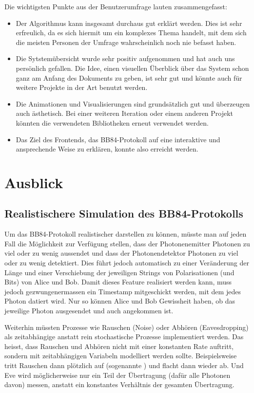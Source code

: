 \documentclass[a4paper,10.2pt,pdftex]{scrartcl}%
\newcommand{\q}[1]{\iflanguage{ngerman}{\flqq#1\frqq}{``#1''}}
\begin{document}
Die wichtigsten Punkte aus der Benutzerumfrage lauten zusammengefasst:

\begin{itemize}
\item Der Algorithmus kann insgesamt durchaus gut erklärt werden. Dies ist sehr erfreulich, da es sich hiermit um ein komplexes Thema handelt, mit dem sich die meisten Personen der Umfrage wahrscheinlich noch nie befasst haben.
\item Die Sytstemübersicht wurde sehr positiv aufgenommen und hat auch uns persönlich gefallen. Die Idee, einen visuellen Überblick über das System schon ganz am Anfang des Dokuments zu geben, ist sehr gut und könnte auch für weitere Projekte in der Art benutzt werden.
\item Die Animationen und Visualisierungen sind grundsätzlich gut und überzeugen auch ästhetisch. Bei einer weiteren Iteration oder einem anderen Projekt könnten die verwendeten Bibliotheken erneut verwendet werden.
\item Das Ziel des Frontends, das BB84-Protokoll auf eine interaktive und ansprechende Weise zu erklären, konnte also erreicht werden. 
\end{itemize}


\section{Ausblick}
\subsection{ Realistischere Simulation des BB84-Protokolls}

Um das BB84-Protokoll realistischer darstellen zu können, müsste man auf jeden Fall die Möglichkeit zur Verfügung stellen, dass der Photonenemitter Photonen zu viel oder zu wenig aussendet und dass der Photonendetektor Photonen zu viel oder zu wenig detektiert. Dies führt jedoch automatisch zu einer Veränderung der Länge und einer Verschiebung der jeweiligen Strings von Polarisationen (und Bits) von Alice und Bob. Damit dieses Feature realisiert werden kann, muss jedoch gezwungenermassen ein Timestamp mitgeschickt werden, mit dem jedes Photon datiert wird. Nur so können Alice und Bob Gewissheit haben, ob das jeweilige Photon ausgesendet und auch angekommen ist.

Weiterhin müssten Prozesse wie Rauschen (Noise) oder Abhören (Eavesdropping) als zeitabhängige anstatt rein stochastische Prozesse implementiert werden. Das heisst, dass Rauschen und Abhören nicht mit einer konstanten Rate auftritt, sondern mit zeitabhängigen Variabeln modelliert werden sollte. Beispielsweise tritt Rauschen dann plötzlich auf (sogenannte \q{bursts}) und flacht dann wieder ab. Und Eve wird möglicherweise nur ein Teil der Übertragung (dafür alle Photonen davon) messen, anstatt ein konstantes Verhältnis der gesamten Übertragung.
\end{document}
